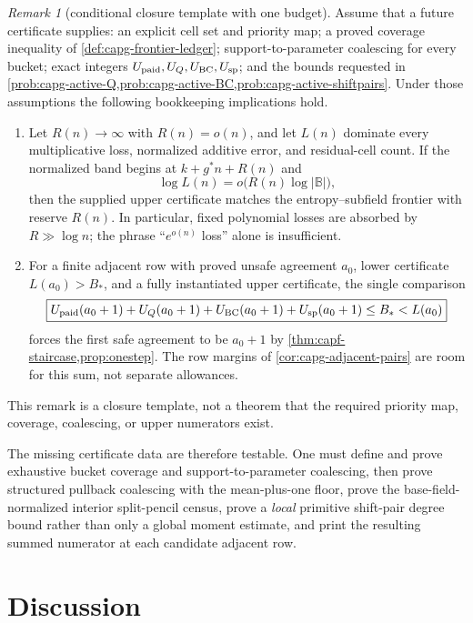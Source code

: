 \documentclass[11pt]{article}
\theoremstyle{definition}
\theoremstyle{remark}
\newtheorem{remark}[remark]{Remark}
\newcommand{\B}{\mathbb{B}}
\begin{document}
\begin{remark}[conditional closure template with one budget]\label{prop:capg-final-active-package}
Assume that a future certificate supplies: an explicit cell set and priority map; a proved coverage inequality of \cref{def:capg-frontier-ledger}; support-to-parameter coalescing for every bucket; exact integers $U_{\rm paid},U_Q,U_{\rm BC},U_{\rm sp}$; and the bounds requested in \cref{prob:capg-active-Q,prob:capg-active-BC,prob:capg-active-shiftpairs}.  Under those assumptions the following bookkeeping implications hold.

\begin{enumerate}[label=\textup{(\roman*)}]
\item Let $R(n)\to\infty$ with $R(n)=o(n)$, and let $L(n)$ dominate every multiplicative loss, normalized additive error, and residual-cell count.  If the normalized band begins at $k+g^*n+R(n)$ and
\[
        \log L(n)=o\!\bigl(R(n)\log|\B|\bigr),
\]
then the supplied upper certificate matches the entropy--subfield frontier with reserve $R(n)$.  In particular, fixed polynomial losses are absorbed by $R\gg\log n$; the phrase ``$e^{o(n)}$ loss'' alone is insufficient.
\item For a finite adjacent row with proved unsafe agreement $a_0$, lower certificate $L(a_0)>B_*$, and a fully instantiated upper certificate, the single comparison
\[
\boxed{
U_{\rm paid}(a_0+1)+U_Q(a_0+1)+U_{\rm BC}(a_0+1)+U_{\rm sp}(a_0+1)
\le B_*<L(a_0)
}
\]
forces the first safe agreement to be $a_0+1$ by \cref{thm:capf-staircase,prop:onestep}.  The row margins of \cref{cor:capg-adjacent-pairs} are room for this sum, not separate allowances.
\end{enumerate}
This remark is a closure template, not a theorem that the required priority map, coverage, coalescing, or upper numerators exist.
\end{remark}

The missing certificate data are therefore testable.  One must define and prove exhaustive bucket coverage and support-to-parameter coalescing, then prove structured pullback coalescing with the mean-plus-one floor, prove the base-field-normalized interior split-pencil census, prove a \emph{local} primitive shift-pair degree bound rather than only a global moment estimate, and print the resulting summed numerator at each candidate adjacent row.

\section{Discussion}\label{sec:discussion}
\end{document}
